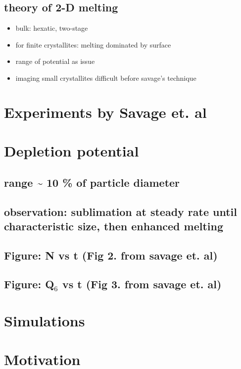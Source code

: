 \documentclass{umthesis}
\begin{document}
\subsection{theory of 2-D melting}
\label{sec-1.1.1}
\begin{itemize}

\item bulk: hexatic, two-stage\\
\label{sec-1.1.1.1}%
\item for finite crystallites: melting dominated by surface\\
\label{sec-1.1.1.2}%
\item range of potential as issue\\
\label{sec-1.1.1.3}%
\item imaging small crystallites difficult before savage's technique\\
\label{sec-1.1.1.4}%
\end{itemize} %
\section{Experiments by Savage et. al}
\label{sec-1.2}
\section{Depletion potential}
\label{sec-1.3}
\subsection{range \~{} 10 \% of particle diameter}
\label{sec-1.3.1}
\subsection{observation: sublimation at steady rate until characteristic size, then enhanced melting}
\label{sec-1.3.2}
\subsection{Figure: N vs t (Fig 2. from savage et. al)}
\label{sec-1.3.3}
\subsection{Figure: Q$_6$ vs t (Fig 3. from savage et. al)}
\label{sec-1.3.4}
\section{Simulations}
\label{sec-1.4}
\section{Motivation}
\label{sec-1.5}
\end{document}
